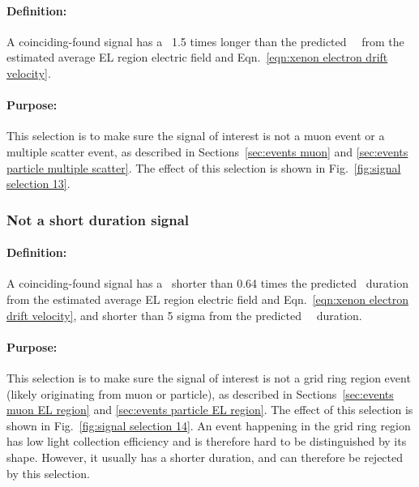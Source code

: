 \paragraph{Definition:}
A coinciding-found signal has a \rpd\ 1.5 times longer than the predicted \ees\ \rpd\ from the estimated average EL region electric field and Eqn.~\ref{eqn:xenon electron drift velocity}. 
\paragraph{Purpose:}
This selection is to make sure the signal of interest is not a muon event or a multiple scatter event, as described in Sections~\ref{sec:events muon} and \ref{sec:events particle multiple scatter}. The effect of this selection is shown in Fig.~\ref{fig:signal selection 13}. 

\subsubsection{Not a short duration signal}
\paragraph{Definition:}
A coinciding-found signal has a \rpd\ shorter than 0.64 times the predicted \ees\ duration from the estimated average EL region electric field and Eqn.~\ref{eqn:xenon electron drift velocity}, and shorter than 5 sigma from the predicted \ees\ \rpd\ duration. 
\paragraph{Purpose:}
This selection is to make sure the signal of interest is not a grid ring region event (likely originating from muon or particle), as described in Sections~\ref{sec:events muon EL region} and \ref{sec:events particle EL region}. The effect of this selection is shown in Fig.~\ref{fig:signal selection 14}. An event happening in the grid ring region has low light collection efficiency and is therefore hard to be distinguished by its shape. However, it usually has a shorter duration, and can therefore be rejected by this selection.

